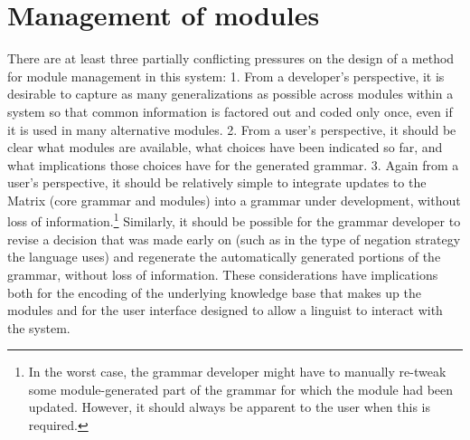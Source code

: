 \documentclass[11pt]{article}
\begin{document}
\section{Management of modules}
\label{management}

There are at least three partially conflicting pressures on the design
of a method for module management in this system: 1. From a developer's
perspective, it is desirable to capture as many generalizations as
possible across modules within a system so that common information is
factored out and coded only once, even if it is used in many
alternative modules. 2. From a user's perspective, it should be clear
what modules are available, what choices have been indicated so far,
and what implications those choices have for the generated grammar.
3. Again from a user's perspective, it should be relatively simple to
integrate updates to the Matrix (core grammar and modules) into a
grammar under development, without loss of information.\footnote{In
the worst case, the grammar developer might have to manually re-tweak
some module-generated part of the grammar for which the module had
been updated.  However, it should always be apparent to the user when
this is required.}  Similarly, it should be possible for the grammar
developer to revise a decision that was made early on (such as in the
type of negation strategy the language uses) and regenerate the
automatically generated portions of the grammar, without loss of
information.  These considerations have implications both for the
encoding of the underlying knowledge base that makes up the modules
and for the user interface designed to allow a linguist to interact
with the system.
\end{document}
